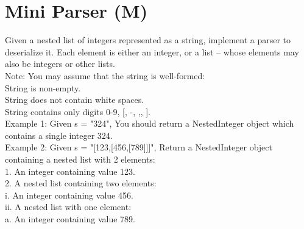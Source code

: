 \section{Mini Parser (M)}
Given a nested list of integers represented as a string, implement a parser to deserialize it. Each element is either an integer, or a list -- whose elements may also be integers or other lists.\\

Note: You may assume that the string is well-formed:\\
    String is non-empty.\\
    String does not contain white spaces.\\
    String contains only digits 0-9, [, -, ,, ].\\

Example 1:
Given s = "324",
You should return a NestedInteger object which contains a single integer 324.\\

Example 2:
Given s = "[123,[456,[789]]]",
Return a NestedInteger object containing a nested list with 2 elements:\\
1. An integer containing value 123.\\
2. A nested list containing two elements:\\
    i.  An integer containing value 456.\\
    ii. A nested list with one element:\\
         a. An integer containing value 789.\\

